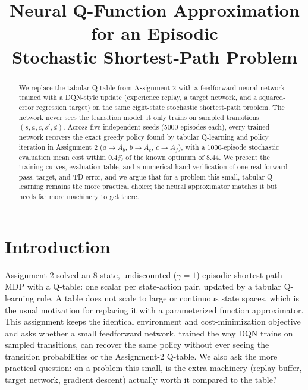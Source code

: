 \documentclass[conference]{IEEEtran}
\begin{document}
\title{Neural Q-Function Approximation for an Episodic\\ Stochastic Shortest-Path Problem}

\author{
}

\maketitle

\begin{abstract}
We replace the tabular Q-table from Assignment 2 with a feedforward neural
network trained with a DQN-style update (experience replay, a target
network, and a squared-error regression target) on the same eight-state
stochastic shortest-path problem. The network never sees the transition
model; it only trains on sampled transitions $(s,a,c,s',d)$. Across five
independent seeds (5000 episodes each), every trained network recovers the
exact greedy policy found by tabular Q-learning and policy iteration in
Assignment 2 ($a{\to}A_b$, $b{\to}A_e$, $c{\to}A_f$), with a 1000-episode
stochastic evaluation mean cost within $0.4\%$ of the known optimum of
$8.44$. We present the training curves, evaluation table, and a numerical
hand-verification of one real forward pass, target, and TD error, and we
argue that for a problem this small, tabular Q-learning remains the more
practical choice; the neural approximator matches it but needs far more
machinery to get there.
\end{abstract}

\section{Introduction}
Assignment 2 solved an 8-state, undiscounted ($\gamma=1$) episodic
shortest-path MDP with a Q-table: one scalar per state-action pair, updated
by a tabular Q-learning rule. A table does not scale to large or continuous
state spaces, which is the usual motivation for replacing it with a
parameterized function approximator. This assignment keeps the identical
environment and cost-minimization objective and asks whether a small
feedforward network, trained the way DQN trains on sampled transitions, can
recover the same policy without ever seeing the transition probabilities or
the Assignment-2 Q-table. We also ask the more practical question: on a
problem this small, is the extra machinery (replay buffer, target network,
gradient descent) actually worth it compared to the table?
\end{document}
